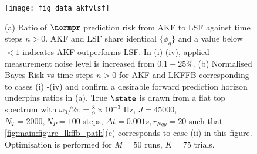 


\begin{figure}[b]
    \texttt{[image: fig\_data\_akfvlsf]}
    \caption{\label{fig:main:fig_data_akfvlsf} (a) Ratio of $\normpr$ prediction risk from AKF to LSF against time steps $n>0$.  AKF and LSF share identical $\{ \phi_q \}$ and  a value below $<1$ indicates AKF outperforms LSF. In (i)-(iv), applied measurement noise level is increased from $0.1 - 25 \%$. (b) Normalised Bayes Risk vs time steps $n>0$ for AKF and LKFFB corresponding to cases (i) -(iv) and confirm a desirable forward prediction horizon underpins ratios in (a). True $\state$ is drawn from a flat top spectrum with $\omega_0 / 2\pi = \frac{8}{9} \times 10^{-3}$ Hz, $J = 45000$, $N_T = 2000, N_P = 100$ steps, $\Delta t = 0.001s, r_{Nqy}=20$ such that \cref{fig:main:figure_lkffb_path}(c) corresponds to case (ii) in this figure. Optimisation is performed for $M=50$ runs, $K=75$ trials.}
\end{figure}

